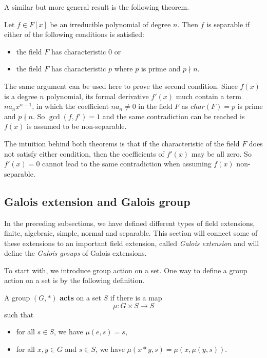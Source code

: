 \documentclass[../main.tex]{subfiles}
\begin{document}
A similar but more general result is the following theorem. 

\begin{theorem}
\label{theorem:char prime implies separable}
Let $f \in F[x]$ be an irreducible polynomial of degree $n$. Then $f$ is separable if either of the following conditions is satisfied: 
\begin{itemize}
    \item the field $F$ has characteristic $0$ or 
    \item the field $F$ has characteristic $p$ where $p$ is prime and $p \nmid n$.
\end{itemize}
\end{theorem}
The same argument can be used here to prove the second condition. Since $f(x)$ is a degree $n$ polynomial, its formal derivative $f'(x)$ much contain a term $n a_n x^{n-1}$, in which the coefficient $n a_n \neq 0$ in the field $F$ as $char(F)=p$ is prime and $p \nmid n$. So $\gcd(f,f')=1$ and the same contradiction can be reached is $f(x)$ is assumed to be non-separable. 

The intuition behind both theorems is that if the characteristic of the field $F$ does not satisfy either condition, then the coefficients of $f'(x)$ may be all zero. So $f'(x)=0$ cannot lead to the same contradiction when assuming $f(x)$ non-separable. 

\subsection{Galois extension and Galois group}
In the preceding subsections, we have defined different types of field extensions, finite, algebraic, simple, normal and separable. This section will connect some of these extensions to an important field extension, called \textit{Galois extension} and will define the \textit{Galois groups} of Galois extensions. 

\reversemarginpar
{}
To start with, we introduce group action on a set. One way to define a group action on a set is by the following definition. 

\begin{definition}
A group $(G,*)$ \textbf{acts} on a set $S$ if there is a map  
\begin{equation*}
    \mu:G \times S \rightarrow S
\end{equation*}
such that 
\begin{itemize}
    \item for all $s \in S$, we have $\mu(e,s)=s$,
    \item for all $x,y \in G$ and $s\in S$, we have $\mu(x * y, s) = \mu(x,\mu(y,s))$.
\end{itemize}
\end{definition}
\end{document}
